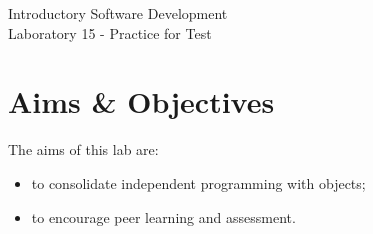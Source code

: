\documentclass[12pt,oneside]{cttutorial}
\begin{document}
\tutorialextra{}


 

\newcommand{\xkcd}[2]{
	\begin{center}
	\texttt{[image: ../../Figures/png/\#1]}
	\newline
	\url{http://xkcd.com/#2}
	\end{center}
	\bigskip
}

\newcommand{\alert}[1]
{\marginpar
  {\makebox[0 pt][l]
    {\texttt{[image: ../../Figures/png/warning.png]}
  }
  \parbox{2 cm}{{\sffamily \bfseries \tiny #1}}}}


\renewcommand{\baselinestretch}{1.5}
\textwidth=15cm

\newcommand{\I}{j}

\begin{center}
\begin{bfseries}
Introductory Software Development\\Laboratory 15 - Practice for Test
\end{bfseries}
\end{center}

\section{Aims \& Objectives}

The aims of this lab are:

\begin{itemize}
\item to consolidate independent programming with objects;
\item to encourage peer learning and assessment.
\end{itemize}
\end{document}
